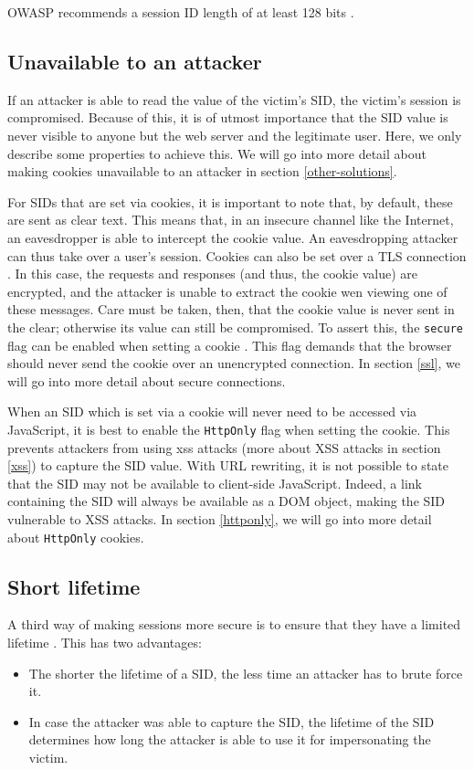 OWASP recommends a session ID length of at least 128 bits \cite{OWASP2009a}.

\subsection{Unavailable to an attacker}
If an attacker is able to read the value of the victim's SID, the victim's session is compromised. Because of this, it is of utmost importance that the SID value is never visible to anyone but the web server and the legitimate user. Here, we only describe some properties to achieve this. We will go into more detail about making cookies unavailable to an attacker in section \ref{other-solutions}.

For SIDs that are set via cookies, it is important to note that, by default, these are sent as clear text. This means that, in an insecure channel like the Internet, an eavesdropper is able to intercept the cookie value. An eavesdropping attacker can thus take over a user's session. Cookies can also be set over a TLS connection \cite{rfc2818}. In this case, the requests and responses (and thus, the cookie value) are encrypted, and the attacker is unable to extract the cookie wen viewing one of these messages. Care must be taken, then, that the cookie value is never sent in the clear; otherwise its value can still be compromised. To assert this, the \texttt{secure} flag can be enabled when setting a cookie \cite{Fu2001, rfc2109}. This flag demands that the browser should never send the cookie over an unencrypted connection. In section \ref{ssl}, we will go into more detail about secure connections.

When an SID which is set via a cookie will never need to be accessed via JavaScript, it is best to enable the \texttt{HttpOnly} flag when setting the cookie. This prevents attackers from using \gls{xss} attacks (more about XSS attacks in section \ref{xss}) to capture the SID value. With URL rewriting, it is not possible to state that the SID may not be available to client-side JavaScript. Indeed, a link containing the SID will always be available as a DOM object, making the SID vulnerable to XSS attacks. In section \ref{httponly}, we will go into more detail about \texttt{HttpOnly} cookies.

\subsection{Short lifetime}
A third way of making sessions more secure is to ensure that they have a limited lifetime \cite{Fu2001}. This has two advantages:
\begin{itemize}
	\item The shorter the lifetime of a SID, the less time an attacker has to brute force it.
	\item In case the attacker was able to capture the SID, the lifetime of the SID determines how long the attacker is able to use it for impersonating the victim.
\end{itemize}

